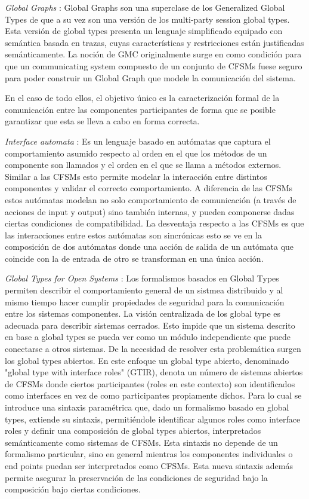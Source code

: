 \emph{Global Graphs} \cite{castagna:lmcs-8_1}: Global Graphs son una superclase de los Generalized Global Types de \cite{denielou:esop12} que a su vez son una versión de los multi-party session global types. Esta versión de global types presenta un lenguaje simplificado equipado con semántica basada en trazas, cuyas características y restricciones están justificadas semánticamente. La noción de GMC originalmente surge en \cite{lange:popl15} como condición para que un communicating system compuesto de un conjunto de CFSMs fuese seguro para poder construir un Global Graph que modele la comunicación del sistema.  

En el caso de todo ellos, el objetivo único es la caracterización formal de la comunicación entre las componentes participantes de forma que se posible garantizar que esta se lleva a cabo en forma correcta.


\emph{Interface automata} \cite{dealfaro:esec-fse-01}: Es un lenguaje basado en autómatas que captura el comportamiento asumido respecto al orden en el que los métodos de un componente son llamados y el orden en el que se llama a métodos externos. Similar a las CFSMs esto permite modelar la interacción entre distintos componentes y validar el correcto comportamiento. A diferencia de las CFSMs estos autómatas modelan no solo comportamiento de comunicación (a través de acciones de input y output) sino también internas, y pueden componerse dadas ciertas condiciones de compatibilidad. La desventaja respecto a las CFSMs es que las interacciones entre estos autómatas son sincrónicas esto se ve en la composición de dos autómatas donde una acción de salida de un autómata que coincide con la de entrada de otro se transforman en una única acción.

\emph{Global Types for Open Systems} \cite{barbanera:eptcs279}: Los formalismos basados en Global Types permiten describir el comportamiento general de un sistmea distribuido y al mismo tiempo hacer cumplir propiedades de seguridad para la comunicación entre los sistemas componentes. La visión centralizada de los global type es adecuada para describir sistemas cerrados. Esto impide que un sistema descrito en base a global types se pueda ver como un módulo independiente que puede conectarse a otros sistemas. De la necesidad de resolver esta problemática surgen los global types abiertos. En este enfoque un global type abierto, denominado "global type with interface roles" (GTIR), denota un número de sistemas abiertos de CFSMs donde ciertos participantes (roles en este contexto) son identificados como interfaces en vez de como participantes propiamente dichos. Para lo cual se introduce una sintaxis paramétrica que, dado un formalismo basado en global types, extiende su sintaxis, permitiéndole identificar algunos roles como interface roles y definir una composición de global types abiertos, interpretados semánticamente como sistemas de CFSMs. Esta sintaxis no depende de un formalismo particular, sino en general mientras los componentes individuales o end points puedan ser interpretados como  CFSMs. Esta nueva sintaxis además permite asegurar la preservación de las condiciones de seguridad bajo la composición bajo ciertas condiciones.

